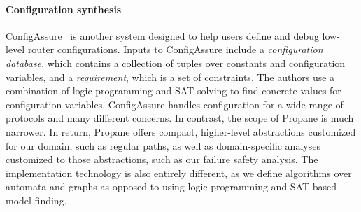 \documentclass[10pt]{sigalternate052015}
\newcommand{\sysname}{{\small \sf Propane}\xspace}
\newcommand{\para}[1]{\paragraph*{\textbf{#1}}}
\begin{document}
\para{Configuration synthesis}
ConfigAssure~\cite{narain:lisa05,narain+:configassure}
is another system designed to
help users define and debug low-level router
configurations.  Inputs to
ConfigAssure include a \emph{configuration database}, which contains a
collection of tuples over constants and configuration variables, and a
\emph{requirement}, which is a set of constraints.
The authors use a combination of logic programming and
SAT solving to find concrete values for configuration variables.
ConfigAssure handles configuration for a wide range of protocols and many
different concerns.  In contrast, the scope of \sysname is much
narrower.  In return, \sysname offers compact, higher-level
abstractions customized for our domain, such as regular paths, as well
as domain-specific analyses customized to those abstractions, such as
our failure safety analysis.  The implementation technology is also
entirely different, as we define algorithms over automata and graphs
as opposed to using logic programming and SAT-based model-finding.




%
%
%
%
\end{document}
